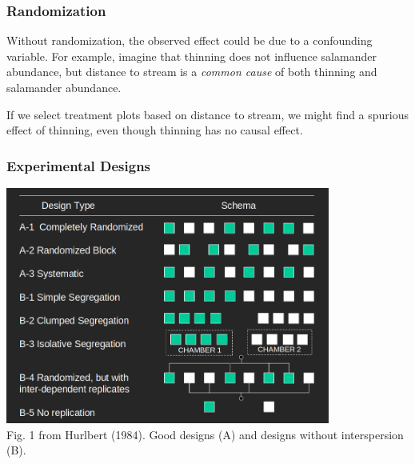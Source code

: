 \documentclass[color=usenames,dvipsnames]{beamer}\usepackage[]{graphicx}\usepackage[]{xcolor}
\begin{document}
\begin{frame}
  \frametitle{Randomization}
  \small
  Without randomization, the observed effect could be due to a
  \alert{confounding variable}. For example, imagine that thinning
  does not influence salamander abundance, but \alert{distance to
    stream} is a {\it common cause} of both thinning and salamander
  abundance. \\  
  \vfill
  \begin{center}
 \end{center}
 \pause
 \vfill
 If we select treatment plots based on distance to stream, we might
 find a spurious effect of thinning, even though thinning has no
 causal effect.  
\end{frame}






\begin{frame}
  \frametitle{Experimental Designs}
  \centering
  \includegraphics[width=0.8\textwidth]{Hurlbert-schema} \\
  \vfill
  Fig. 1 from Hurlbert (1984). Good designs (A) and designs without
  interspersion (B). \\
\end{frame}
\end{document}
